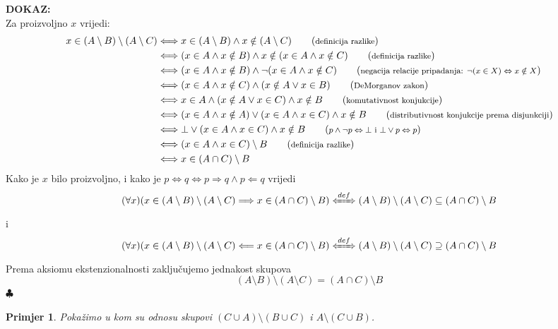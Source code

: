 \documentclass{article}
\newcommand{\kom}[1]{\tag{\textrm{\footnotesize #1}}\\}
\newtheorem{primjer}{Primjer}
\newenvironment{dokaz}
    {\noindent\textbf{DOKAZ:}\\} {\hfill $\clubsuit$}
\begin{document}
\begin{dokaz}

    Za proizvoljno $x$ vrijedi:
    \begin{align*}
        x\in (A\setminus B)\setminus (A\setminus C) &\Longleftrightarrow    x\in (A\setminus B)\land x\notin (A\setminus C)                 \kom{definicija razlike}
                                                    &\Longleftrightarrow    (x\in A\land x\notin B)\land x\notin (x\in A\land x\notin C)    \kom{definicija razlike}
                                                    &\Longleftrightarrow    (x\in A\land x\notin B)\land \lnot (x\in A\land x\notin C)      \kom{negacija relacije pripadanja: $\lnot (x\in X)\Leftrightarrow x\notin X$}
                                                    &\Longleftrightarrow    (x\in A\land x\notin C)\land (x\notin A\lor x\in B)             \kom{DeMorganov zakon}
                                                    &\Longleftrightarrow    x\in A\land (x\notin A\lor x\in C)\land x\notin B               \kom{komutativnost konjukcije}
                                                    &\Longleftrightarrow    (x\in A\land x\notin A)\lor (x\in A\land x\in C)\land x\notin B \kom{distributivnost konjukcije prema disjunkciji}
                                                    &\Longleftrightarrow    \bot \lor (x\in A\land x\in C)\land x\notin B                   \kom{$p\land\lnot p\Leftrightarrow \bot$ i $\bot\lor p\Leftrightarrow p$}
                                                    &\Longleftrightarrow    (x\in A\land x\in C)\setminus B                                 \kom{definicija razlike}
                                                    &\Longleftrightarrow    x\in (A\cap C)\setminus B
    \end{align*}
    Kako je $x$ bilo proizvoljno, i kako je $p\Leftrightarrow q \Longleftrightarrow p\Rightarrow q\land p\Leftarrow q$ vrijedi
    $$(\forall x)(x\in (A\setminus B)\setminus (A\setminus C) \Longrightarrow x\in (A\cap C)\setminus B)\xLeftrightarrow{def}(A\setminus B)\setminus (A\setminus C)\subseteq (A\cap C)\setminus B$$
    i
    $$(\forall x)(x\in (A\setminus B)\setminus (A\setminus C) \Longleftarrow x\in (A\cap C)\setminus B)\xLeftrightarrow{def}(A\setminus B)\setminus (A\setminus C)\supseteq (A\cap C)\setminus B$$
    Prema aksiomu ekstenzionalnosti zaključujemo jednakost skupova
    $$(A\setminus B)\setminus (A\setminus C)=(A\cap C)\setminus B$$
\end{dokaz}

\newpage
\begin{primjer}
    Pokažimo u kom su odnosu skupovi $(C\cup A)\setminus (B\cup C)$ i $A\setminus (C\cup B)$.
\end{primjer}
\end{document}
